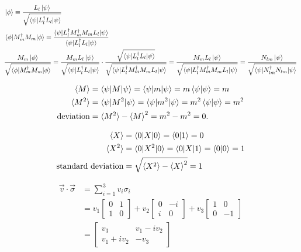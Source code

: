 \begin{align*}
	&\ket{\phi} \equiv \frac{L_l \ket{\psi}}{\sqrt{\braket{\psi |L_l^\dagger L_l | \psi}}}\\
	&\braket{\phi | M_m^\dagger M_m | \phi} = \frac{\braket{\psi | L_l^\dagger M_m^\dagger M_m L_l | \psi}}{\braket{\psi | L_l^\dagger L_l | \psi}} \\
%
	&\frac{M_m \ket{\phi}}{\sqrt{\braket{\phi | M_m^\dagger M_m | \phi}}} =
		\frac{M_m L_l \ket{\psi}}{\sqrt{\braket{\psi |L_l^\dagger L_l | \psi}}}
		\cdot
		\frac{ \sqrt{\braket{\psi | L_l^\dagger L_l | \psi}} }{ \sqrt{\braket{\psi | L_l^\dagger M_m^\dagger M_m L_l | \psi}} }
		=
		\frac{M_m L_l \ket{\psi}}{ \sqrt{\braket{\psi | L_l^\dagger M_m^\dagger M_m L_l | \psi}} }
		=
		\frac{N_{lm} \ket{\psi}}{\sqrt{\braket{\psi |N^\dagger_{lm}  N_{lm}  | \psi}}}
\end{align*}



\begin{align*}
	\braket{M} &= \braket{ \psi | M | \psi} = \braket{\psi | m | \psi} = m \braket{\psi | \psi} = m\\
	\braket{M^2} &= \braket{ \psi | M^2 | \psi} = \braket{\psi | m^2 | \psi} = m^2 \braket{\psi | \psi} = m^2\\
	\text{deviation} &= \braket{M^2} - \braket{M}^2 = m^2 - m^2 = 0.
\end{align*}


\begin{align*}
	\braket{X} &= \braket{0 | X | 0} = \braket{0 | 1} = 0\\
	\braket{X^2} &= \braket{0 | X^2 | 0} = \braket{0 | X | 1} =\braket{0 | 0} = 1\\
	\text{standard deviation} &= \sqrt{ \braket{X^2} - \braket{X}^2 } = 1
\end{align*}


\begin{align*}
\vec{v} \cdot \vec{\sigma} &= \sum_{i=1}^3 v_i \sigma_i\\
&= v_1 \begin{bmatrix}
0 & 1 \\ 
1 & 0
\end{bmatrix}
+ v_2 \begin{bmatrix}
0 & -i \\ 
i & 0
\end{bmatrix}
+ v_3 \begin{bmatrix}
1 & 0 \\ 
0 & -1
\end{bmatrix} \\
&= \begin{bmatrix}
v_3 & v_1 - i v_2 \\ 
v_1 + iv_2 & -v_3
\end{bmatrix}
\end{align*}

